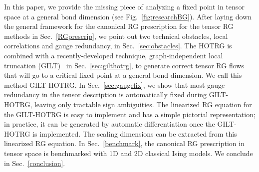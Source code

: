 \documentclass[aps,prr,reprint,superscriptaddress,floatfix]{revtex4-2}
\begin{document}
In this paper, we provide the missing piece of analyzing a fixed point in tensor space at a general bond dimension (see Fig.~\ref{fig:researchBG}).
After laying down the general framework for the canonical RG prescription for the tensor RG methods in Sec.~\ref{RGprescrip}, we point out two technical obstacles, local correlations and gauge redundancy, in Sec.~\ref{sec:obstacles}.
The HOTRG is combined with a recently-developed technique, graph-independent local truncation (GILT)~\cite{gilts} in Sec.~\ref{sec:gilthotrg}, to generate correct tensor RG flows that will go to a critical fixed point at a general bond dimension. 
We call this method GILT-HOTRG\@.
In Sec.~\ref{sec:gaugefix}, we show that most gauge redundancy in the tensor description is automatically fixed during GILT-HOTRG, leaving only tractable sign ambiguities.
The linearized RG equation for the GILT-HOTRG is easy to implement and has a simple pictorial representation; in practice, it can be generated by automatic differentiation once the GILT-HOTRG is implemented.
The scaling dimensions can be extracted from this linearized RG equation.
In Sec.~\ref{benchmark}, the canonical RG prescription in tensor space is benchmarked with 1D and 2D classical Ising models.
We conclude in Sec.~\ref{conclusion}.
\end{document}
